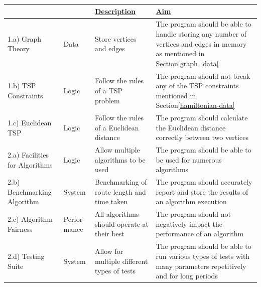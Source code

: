 \begin{table}[!ht]
    \centering
    \renewcommand{\arraystretch}{1.2} %
    \begin{tabularx}{\textwidth}{
    |>{\raggedright\arraybackslash}p{3cm}
    |>{\raggedright\arraybackslash}p{1.3cm}
    |>{\raggedright\arraybackslash}p{4cm}
    |>{\raggedright\arraybackslash}X|}
\hline
\multicolumn{1}{|c|}{{\ul \textbf{Name}}} & \multicolumn{1}{c|}{{\ul \textbf{Type}}} & {\ul \textbf{Description}}               & {\ul \textbf{Aim}}                                                                                                          \\ \hline
1.a) Graph Theory                              & Data                                     & Store vertices and edges                    & The program should be able to handle storing any number of vertices and edges in memory as mentioned in Section\ref{graph_data} \\ \hline
1.b) TSP Constraints                           & Logic                                    & Follow the rules of a TSP problem           & The program should not break any of the TSP constraints mentioned in Section\ref{hamiltonian-data}                                                \\ \hline
1.c) Euclidean TSP                             & Logic                                    & Follow the rules of a Euclidean distance    & The program should calculate the Euclidean distance correctly between two vertices                                          \\ \hline
2.a) Facilities for Algorithms                 & Logic                                    & Allow multiple algorithms to be used        & The program should be able to be used for numerous algorithms                                                               \\ \hline
2.b) Benchmarking Algorithm                    & System                                   & Benchmarking of route length and time taken & The program should accurately report and store the results of an algorithm execution                                         \\ \hline
2.c) Algorithm Fairness                        & Perfor-
mance                              & All algorithms should operate at their best & The program should not negatively impact the performance of an algorithm \\ \hline
2.d) Testing Suite                             & System                                   & Allow for multiple different types of tests & The program should be able to run various types of tests with many parameters repetitively and for long periods \\ \hline

\end{tabularx}
\end{table}
